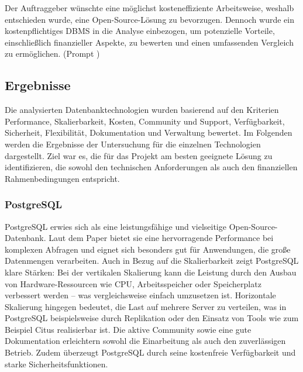 \vspace{3mm}
\noindent Der Auftraggeber wünschte eine möglichst kosteneffiziente Arbeitsweise, weshalb entschieden wurde, eine Open-Source-Lösung zu bevorzugen. Dennoch wurde ein kostenpflichtiges DBMS in die Analyse einbezogen, um potenzielle Vorteile, einschließlich finanzieller Aspekte, zu bewerten und einen umfassenden Vergleich zu ermöglichen. (Prompt \cite{ChatGPT:rewrite2})

\subsection{Ergebnisse}

Die analysierten Datenbanktechnologien wurden basierend auf den Kriterien Performance, Skalierbarkeit, Kosten, Community und Support, Verfügbarkeit, Sicherheit, Flexibilität, Dokumentation und Verwaltung bewertet. Im Folgenden werden die Ergebnisse der Untersuchung für die einzelnen Technologien dargestellt. Ziel war es, die für das Projekt am besten geeignete Lösung zu identifizieren, die sowohl den technischen Anforderungen als auch den finanziellen Rahmenbedingungen entspricht.

\subsubsection{PostgreSQL}
PostgreSQL erwies sich als eine leistungsfähige und vielseitige Open-Source-Datenbank. Laut dem Paper \cite{Paper:performanceComparison} bietet sie eine hervorragende Performance bei komplexen Abfragen und eignet sich besonders gut für Anwendungen, die große Datenmengen verarbeiten. Auch in Bezug auf die Skalierbarkeit zeigt PostgreSQL klare Stärken: Bei der vertikalen Skalierung kann die Leistung durch den Ausbau von Hardware-Ressourcen wie CPU, Arbeitsspeicher oder Speicherplatz verbessert werden – was vergleichsweise einfach umzusetzen ist. Horizontale Skalierung hingegen bedeutet, die Last auf mehrere Server zu verteilen, was in PostgreSQL beispielsweise durch Replikation oder den Einsatz von Tools wie zum Beispiel Citus realisierbar ist. Die aktive Community sowie eine gute Dokumentation erleichtern sowohl die Einarbeitung als auch den zuverlässigen Betrieb. Zudem überzeugt PostgreSQL durch seine kostenfreie Verfügbarkeit und starke Sicherheitsfunktionen. 

